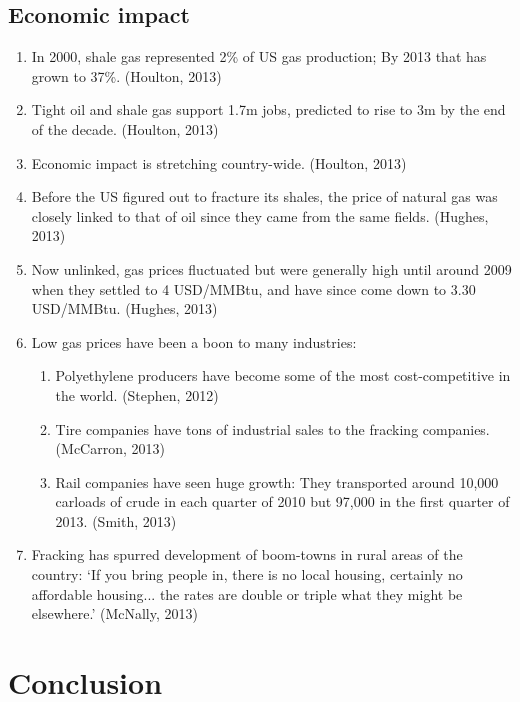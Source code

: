 \documentclass{article}
\begin{document}
  \subsection{Economic impact}
    \begin{enumerate}
      \item In 2000, shale gas represented 2\% of US gas production; By 2013 that has grown to 37\%. (Houlton, 2013)
      \item Tight oil and shale gas support 1.7m jobs, predicted to rise to 3m by the end of the decade. (Houlton, 2013)
      \item Economic impact is stretching country-wide. (Houlton, 2013)
      \item Before the US figured out to fracture its shales, the price of natural gas was closely linked to that of oil since they came from the same fields. (Hughes, 2013)
      \item Now unlinked, gas prices fluctuated but were generally high until around 2009 when they settled to 4 USD/MMBtu, and have since come down to 3.30 USD/MMBtu. (Hughes, 2013)
      \item Low gas prices have been a boon to many industries:
        \begin{enumerate}
          \item Polyethylene producers have become some of the most cost-competitive in the world. (Stephen, 2012)
          \item Tire companies have tons of industrial sales to the fracking companies. (McCarron, 2013)
          \item Rail companies have seen huge growth: They transported around 10,000 carloads of crude in each quarter of 2010 but 97,000 in the first quarter of 2013. (Smith, 2013)
        \end{enumerate}
      \item Fracking has spurred development of boom-towns in rural areas of the country: `If you bring people in, there is no local housing, certainly no affordable housing... the rates are double or triple what they might be elsewhere.' (McNally, 2013)
    \end{enumerate}
    

\section{Conclusion}
\end{document}
